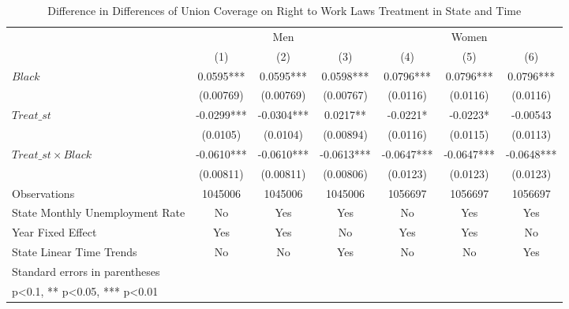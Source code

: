 \begin{table}[htbp]\centering
\def\sym#1{\ifmmode^{#1}\else\(^{#1}\)\fi}
\caption{Difference in Differences of Union Coverage on Right to Work Laws Treatment in State and Time}
\begin{tabular}{l*{6}{c}}
\hline\hline
                    &\multicolumn{3}{c}{Men}                        &\multicolumn{3}{c}{Women}                      \\\cmidrule(lr){2-4}\cmidrule(lr){5-7}
                    &\multicolumn{1}{c}{(1)}   &\multicolumn{1}{c}{(2)}   &\multicolumn{1}{c}{(3)}   &\multicolumn{1}{c}{(4)}   &\multicolumn{1}{c}{(5)}   &\multicolumn{1}{c}{(6)}   \\
\hline
$ Black $           &      0.0595***&      0.0595***&      0.0598***&      0.0796***&      0.0796***&      0.0796***\\
                    &   (0.00769)   &   (0.00769)   &   (0.00767)   &    (0.0116)   &    (0.0116)   &    (0.0116)   \\
[1em]
$ Treat\_{st} $      &     -0.0299***&     -0.0304***&      0.0217** &     -0.0221*  &     -0.0223*  &    -0.00543   \\
                    &    (0.0105)   &    (0.0104)   &   (0.00894)   &    (0.0116)   &    (0.0115)   &    (0.0113)   \\
[1em]
$ Treat\_{st} \times Black $&     -0.0610***&     -0.0610***&     -0.0613***&     -0.0647***&     -0.0647***&     -0.0648***\\
                    &   (0.00811)   &   (0.00811)   &   (0.00806)   &    (0.0123)   &    (0.0123)   &    (0.0123)   \\
\hline
Observations        &     1045006   &     1045006   &     1045006   &     1056697   &     1056697   &     1056697   \\
State Monthly Unemployment Rate&          No   &         Yes   &         Yes   &          No   &         Yes   &         Yes   \\
Year Fixed Effect   &         Yes   &         Yes   &          No   &         Yes   &         Yes   &          No   \\
State Linear Time Trends&          No   &          No   &         Yes   &          No   &          No   &         Yes   \\
\hline\hline
\multicolumn{7}{l}{\footnotesize Standard errors in parentheses}\\
\multicolumn{7}{l}{\footnotesize * p<0.1, ** p<0.05, *** p<0.01}\\
\end{tabular}
\end{table}
